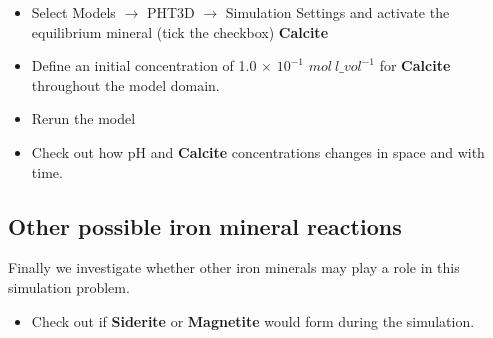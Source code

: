 \begin{itemize}

\item Select Models $\rightarrow$ PHT3D $\rightarrow$ Simulation Settings and activate the equilibrium mineral (tick the checkbox) {\color{red} \textbf{Calcite}} 

\item Define an initial concentration of 1.0 $\times$ $10^{-1}$ $mol\ l\_{vol}^{-1}$ for {\color{red} \textbf{Calcite}} throughout the model domain. 

\item Rerun the model

\item Check out how pH and {\color{red} \textbf{Calcite}} concentrations changes in space and with time.

\end{itemize}

\subsection[Other possible iron mineral reaction]{Other possible iron mineral reactions} 

Finally we investigate whether other iron minerals may play a role in this simulation problem.

\begin{itemize}

\item Check out if {\color{red} \textbf{Siderite}} or {\color{red} \textbf{Magnetite}}  
would form during the simulation.


\end{itemize}
 






